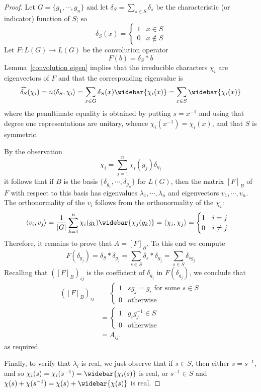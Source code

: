 \begin{proof}
Let $G=\{g_1,\cdots,g_n\}$ and let $\delta_S=\sum_{s\in S}\delta_s$ be the characteristic (or indicator) function of $S$; so
\[\delta_S(x)=\begin{cases}
1&x\in S\\
0&x\notin S
\end{cases}\]
Let $F:L(G)\to L(G)$ be the convolution operator
\[F(b)=\delta_S\ast b\]
Lemma~\ref{convolution eigen} implies that the irreducible characters $\chi_i$ are eigenvectors of $F$ and that the corresponding eigenvalue is
\[\widehat{\delta_S}(\chi_i)=n\langle\delta_S,\chi_i\rangle=\sum_{x\in G}\delta_S(x)\widebar{\chi_i(x)}=\sum_{x\in S}\widebar{\chi_i(x)}\]
where the penultimate equality is obtained by putting $s=x^{-1}$ and using that degree one representations are unitary, whence $\chi_i(x^{-1})=\chi_i(x)$, and that $S$ is symmetric.\par
By the observation
\[\chi_i=\sum_{j=1}^{n}\chi_i(g_j)\delta_{g_j}\]
it follows that if $B$ is the basis $\{\delta_{g_1},\cdots,\delta_{g_n}\}$ for $L(G)$, then the matrix $[F]_B$ of $F$ with respect to this basis has eigenvalues $\lambda_1,\cdots,\lambda_n$ and eigenvectors $v_1,\cdots,v_n$.
The orthonormality of the $v_i$ follows from the orthonormality of the $\chi_i$:
\begin{align*}
\langle v_i,v_j\rangle&=\frac{1}{|G|}\sum_{k=1}^{n}\chi_i(g_k)\widebar{\chi_j(g_k)}=\langle\chi_i,\chi_j\rangle=\begin{cases}
1&i=j\\
0&i\neq j
\end{cases}
\end{align*}
Therefore, it remains to prove that $A=[F]_B$. To this end we compute
\[F(\delta_{g_j})=\delta_S\ast\delta_{g_j}=\sum_{s\in S}\delta_s\ast\delta_{g_j}=\sum_{s\in S}\delta_{sg_j}\]
Recalling that $([F]_B)_{ij}$ is the coefficient of $\delta_{g_j}$ in $F(\delta_{g_j})$, we conclude that
\begin{align*}
([F]_B)_{ij}&=\begin{cases}
1&sg_j=g_i\text{ for some $s\in S$}\\
0&\text{otherwise}
\end{cases}\\
&=\begin{cases}
1&g_ig_j^{-1}\in S\\
0&\text{otherwise}
\end{cases}\\
&=A_{ij}.
\end{align*}
as required.\par
Finally, to verify that $\lambda_i$ is real, we just observe that if $s\in S$, then either $s=s^{-1}$, and so $\chi_i(s)=\chi_i(s^{-1})=\widebar{\chi_i(s)}$ is real, or $s^{-1}\in S$ and $\chi(s)+\chi(s^{-1})=\chi(s)+\widebar{\chi(s)}$ is real.
\end{proof}

